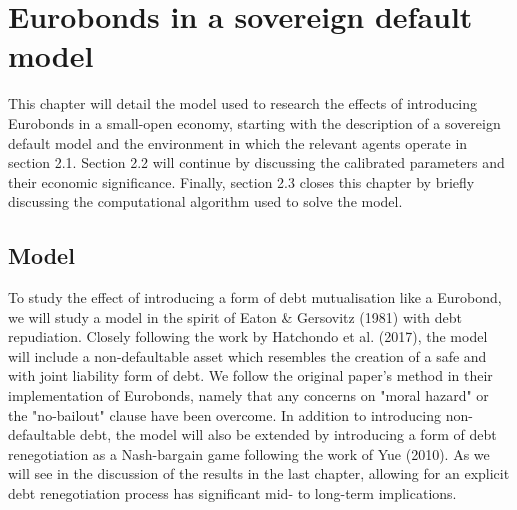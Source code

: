 
\pagestyle{headings}

\chapter{Eurobonds in a sovereign default model}
This chapter will detail the model used to research the effects of introducing Eurobonds in a small-open economy, starting with the description of a sovereign default model and the environment in which the relevant agents operate in section 2.1. Section 2.2 will continue by discussing the calibrated parameters and their economic significance. Finally, section 2.3 closes this chapter by briefly discussing the computational algorithm used to solve the model.\\
\section{Model}
To study the effect of introducing a form of debt mutualisation like a Eurobond, we will study a model in the spirit of Eaton \& Gersovitz (1981) with debt repudiation. Closely following the work by Hatchondo et al. (2017), the model will include a non-defaultable asset which resembles the creation of a safe and with joint liability form of debt. We follow the original paper's method in their implementation of Eurobonds, namely that any concerns on "moral hazard" or the "no-bailout" clause have been overcome. In addition to introducing non-defaultable debt, the model will also be extended by introducing a form of debt renegotiation as a Nash-bargain game following the work of Yue (2010). As we will see in the discussion of the results in the last chapter, allowing for an explicit debt renegotiation process has significant mid- to long-term implications.\\
